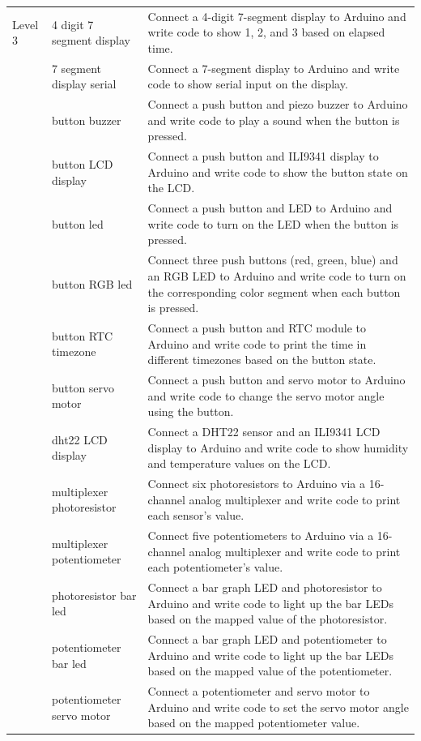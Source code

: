 \documentclass{article} %
\begin{document}
\begin{longtable}{@{}p{1.5cm}p{4cm}p{8.5cm}@{}}
Level 3 & 4 digit 7 segment display & Connect a 4-digit 7-segment display to Arduino and write code to show 1, 2, and 3 based on elapsed time. \\
& 7 segment display serial & Connect a 7-segment display to Arduino and write code to show serial input on the display. \\
& button buzzer & Connect a push button and piezo buzzer to Arduino and write code to play a sound when the button is pressed. \\
& button LCD display & Connect a push button and ILI9341 display to Arduino and write code to show the button state on the LCD. \\
& button led & Connect a push button and LED to Arduino and write code to turn on the LED when the button is pressed. \\
& button RGB led & Connect three push buttons (red, green, blue) and an RGB LED to Arduino and write code to turn on the corresponding color segment when each button is pressed. \\
& button RTC timezone & Connect a push button and RTC module to Arduino and write code to print the time in different timezones based on the button state. \\
& button servo motor & Connect a push button and servo motor to Arduino and write code to change the servo motor angle using the button. \\
& dht22 LCD display & Connect a DHT22 sensor and an ILI9341 LCD display to Arduino and write code to show humidity and temperature values on the LCD. \\
& multiplexer photoresistor & Connect six photoresistors to Arduino via a 16-channel analog multiplexer and write code to print each sensor's value. \\
& multiplexer potentiometer & Connect five potentiometers to Arduino via a 16-channel analog multiplexer and write code to print each potentiometer's value. \\
& photoresistor bar led & Connect a bar graph LED and photoresistor to Arduino and write code to light up the bar LEDs based on the mapped value of the photoresistor. \\
& potentiometer bar led & Connect a bar graph LED and potentiometer to Arduino and write code to light up the bar LEDs based on the mapped value of the potentiometer. \\
& potentiometer servo motor & Connect a potentiometer and servo motor to Arduino and write code to set the servo motor angle based on the mapped potentiometer value. \\
\midrule


\end{longtable}
\end{document}
